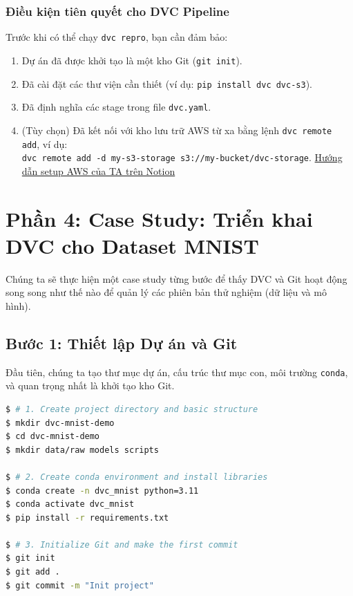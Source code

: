 \documentclass[11pt]{article}
\begin{document}
\subsubsection{Điều kiện tiên quyết cho DVC Pipeline}
Trước khi có thể chạy \texttt{dvc repro}, bạn cần đảm bảo:
\begin{enumerate}
    \item Dự án đã được khởi tạo là một kho Git (\texttt{git init}).
    \item Đã cài đặt các thư viện cần thiết (ví dụ: \texttt{pip install dvc dvc-s3}).
    \item Đã định nghĩa các stage trong file \texttt{dvc.yaml}.
    \item (Tùy chọn) Đã kết nối với kho lưu trữ AWS từ xa bằng lệnh \texttt{dvc remote add}, ví dụ: \\ \texttt{dvc remote add -d my-s3-storage s3://my-bucket/dvc-storage}. \href{https://tidy-legume-f9c.notion.site/H-ng-d-n-c-i-t-v-s-d-ng-AWS-S3-tr-n-CMD-Window-27f2acdfb48a80cb953eceeb97e30b0a}{Hướng dẫn setup AWS của TA trên Notion}
\end{enumerate}



\section{Phần 4: Case Study: Triển khai DVC cho Dataset MNIST}
Chúng ta sẽ thực hiện một case study từng bước để thấy DVC và Git hoạt động song song như thế nào để quản lý các phiên bản thử nghiệm (dữ liệu và mô hình).

\subsection{Bước 1: Thiết lập Dự án và Git}
Đầu tiên, chúng ta tạo thư mục dự án, cấu trúc thư mục con, môi trường \texttt{conda}, và quan trọng nhất là khởi tạo kho Git.

\begin{lstlisting}[language=bash]
$ # 1. Create project directory and basic structure
$ mkdir dvc-mnist-demo
$ cd dvc-mnist-demo
$ mkdir data/raw models scripts

$ # 2. Create conda environment and install libraries
$ conda create -n dvc_mnist python=3.11
$ conda activate dvc_mnist
$ pip install -r requirements.txt

$ # 3. Initialize Git and make the first commit
$ git init
$ git add .
$ git commit -m "Init project"
\end{lstlisting}
\end{document}
